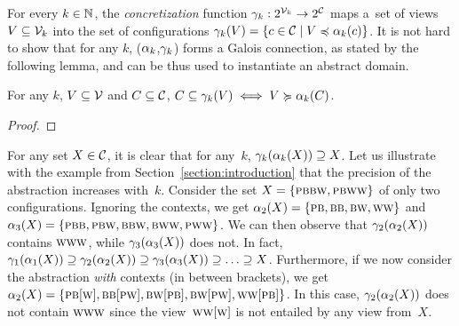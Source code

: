 For every $k\in \mathbb N$, the {\it concretization} function
$\gamma_k: 2^{\mathcal{V}_{k}}\rightarrow2^\mathcal C$ maps a~set of views
$V\subseteq\mathcal{V}_{k}$ into the set of configurations 
%
$\gamma_{k}(V) = \{{c\in\mathcal C}\mathrel{}\mid\mathrel{}{V\preccurlyeq\alpha_{k}(c)}\}$.
It is not hard to show that for any $k$, ($\alpha_{k}$,$\gamma_{k}$)
forms a Galois connection, as stated by the following lemma, and can
be thus used to instantiate an abstract domain.
\begin{lemma}\label{lemma:galois}
For any $k$, $V\subseteq \mathcal{V}$ and $C\subseteq \mathcal C$, $C\subseteq \gamma_{k} (V) \iff V \succcurlyeq \alpha_{k} (C)$.
\end{lemma}
\begin{proof}
\end{proof}
%

For any set $X\in\mathcal C$, it is clear that for any~$k$,
$\gamma_{k}(\alpha_{k}(X))\supseteq X$. %
Let us illustrate with the example from
Section~\ref{section:introduction} that the precision of the
abstraction increases with~$k$.
%
Consider the set $X=\{\textsc{p}\textsc{b}\textsc{b}\textsc{w},\textsc{p}\textsc{b}\textsc{w}\textsc{w}\}$ of only two configurations.
%
Ignoring the contexts, we get $\alpha_{2}(X) =
\{\textsc{p}\textsc{b},\textsc{b}\textsc{b},\textsc{b}\textsc{w},\textsc{w}\textsc{w}\}$ and $\alpha_{3}(X) =
\{\textsc{p}\textsc{b}\textsc{b},\textsc{p}\textsc{b}\textsc{w},\textsc{b}\textsc{b}\textsc{w},\textsc{b}\textsc{w}\textsc{w},\textsc{p}\textsc{w}\textsc{w}\}$. %
We can then observe that $\gamma_{2}(\alpha_{2}(X))$ contains
$\textsc{w}\textsc{w}\textsc{w}$, while $\gamma_{3}(\alpha_{3}(X))$ does not.
%
In fact,
$\gamma_{1}(\alpha_{1}(X))\supseteq\gamma_{2}(\alpha_{2}(X))\supseteq\gamma_{3}(\alpha_{3}(X))\supseteq\ldots\supseteq{X}$. %
%
Furthermore, if we now consider the abstraction \emph{with} contexts
(in between brackets), we get $\alpha_{2}(X) =
\{\textsc{p}\textsc{b}[\textsc{w}],\textsc{b}\textsc{b}[\textsc{p}\textsc{w}],\textsc{b}\textsc{w}[\textsc{p}\textsc{b}],\textsc{b}\textsc{w}[\textsc{p}\textsc{w}],\textsc{w}\textsc{w}[\textsc{p}\textsc{b}]\}$. %
%
In this case, $\gamma_{2}(\alpha_{2}(X))$ does not contain
$\textsc{w}\textsc{w}\textsc{w}$ since the view~$\textsc{w}\textsc{w}[\textsc{w}]$ is not entailed by any view
from~$X$.


